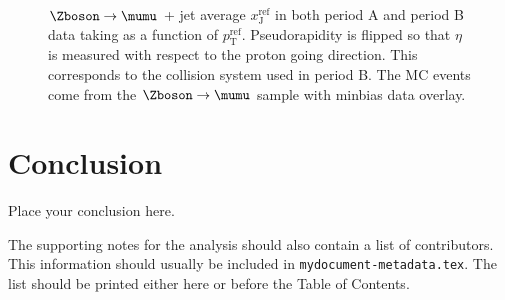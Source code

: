 \documentclass[NOTE, atlasdraft=true, texlive=2016, USenglish]{\ATLASLATEXPATH atlasdoc}
\begin{document}
\begin{figure}[htbp]
{		\label{fig:xjzmumu4PABDO}
	}
	\caption{$\Zboson\rightarrow\mumu$ + jet average $x_{\text{J}}^{\text{ref}}$ in both period A and period B data taking as a function of $p_{\text{T}}^{\text{ref}}$. Pseudorapidity is flipped so that $\eta$ is measured with respect to the proton going direction. This corresponds to the collision system used in period B. The MC events come from the $\Zboson\rightarrow\mumu$ sample with minbias data overlay.}
	\label{fig:xjzmumuPABDO}
\end{figure}

\section{Conclusion}
\label{sec:conclusion}

Place your conclusion here.


\printbibliography
% 
% 

\clearpage
The supporting notes for the analysis should also contain a list of contributors.
This information should usually be included in \texttt{mydocument-metadata.tex}.
The list should be printed either here or before the Table of Contents.
\end{document}
